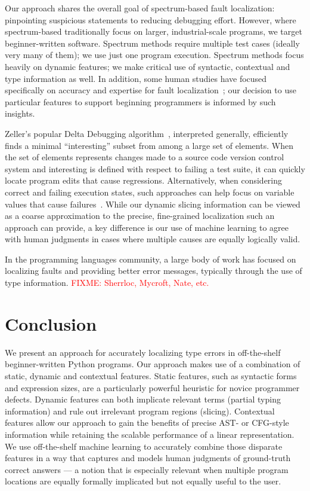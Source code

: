 \documentclass[conference]{IEEEtran}
\newcommand{\fixme}[1]{\textcolor{red}{FIXME: #1}}
\begin{document}
Our approach shares the overall goal of spectrum-based fault localization:
pinpointing suspicious statements to reducing debugging effort. However,
where spectrum-based traditionally focus on larger, industrial-scale
programs, we target beginner-written software. Spectrum methods require
multiple test cases (ideally very many of them); we use just one program
execution. Spectrum methods focus heavily on dynamic features; we make
critical use of syntactic, contextual and type information as well.
In addition, some human studies have focused specifically on accuracy and
expertise for fault localization~\cite{fry2010,Prabhakararao03,ruthruff05};
our decision to use particular features to support beginning programmers is
informed by such insights.

Zeller's popular Delta Debugging algorithm~\cite{zeller99}, interpreted
generally, efficiently finds a minimal ``interesting'' subset from among a
large set of elements. When the set of elements represents changes made to
a source code version control system and interesting is defined with
respect to failing a test suite, it can quickly locate program edits that
cause regressions. Alternatively, when considering correct and failing
execution states, such approaches can help focus on variable values that
cause failures~\cite{zeller05}. While our dynamic slicing information can
be viewed as a coarse approximation to the precise, fine-grained
localization such an approach can provide, a key difference is our use
of machine learning to agree with human judgments in cases where multiple
causes are equally logically valid.

In the programming languages community, a large body of work has focused on
localizing faults and providing better error messages, typically through
the use of type information. \fixme{Sherrloc, Mycroft, Nate, etc.}




\section{Conclusion}

We present an approach for accurately localizing type errors in
off-the-shelf beginner-written Python programs. Our approach makes use of a
combination of static, dynamic and contextual features. Static features,
such as syntactic forms and expression sizes, are a particularly powerful
heuristic for novice programmer defects. Dynamic features can both
implicate relevant terms (partial typing information) and rule out
irrelevant program regions (slicing). Contextual features allow our
approach to gain the benefits of precise AST- or CFG-style information
while retaining the scalable performance of a linear representation.
We use off-the-shelf machine learning to accurately combine those disparate
features in a way that captures and models human judgments of ground-truth
correct answers --- a notion that is especially relevant when multiple
program locations are equally formally implicated but not equally useful to
the user.
\end{document}
